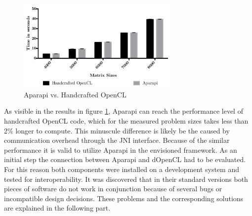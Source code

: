 \begin{figure}[H]
	\includegraphics[width=0.7\textwidth]{images/aparapivsopencl.pdf}
	\centering
	\caption{Aparapi vs. Handcrafted OpenCL}
	\label{img:aparapi_vs_opencl}
\end{figure}

As visible in the results in figure \ref{img:aparapi_vs_opencl}, Aparapi can reach the performance level of handcrafted OpenCL code, which for the measured problem sizes takes less than 2\% longer to compute. This minuscule difference is likely be the caused by communication overhead through the JNI interface. Because of the similar performance it is valid to utilize Aparapi in the envisioned framework. As an initial step the connection between Aparapi and dOpenCL had to be evaluated. For this reason both components were installed on a development system and tested for interoperability. It was discovered that in their standard versions both pieces of software do not work in conjunction because of several bugs or incompatible design decisions. These problems and the corresponding solutions are explained in the following part.

